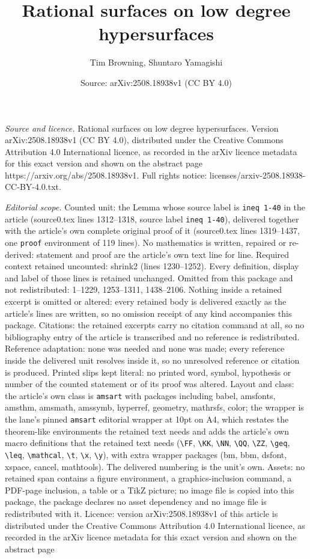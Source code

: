 \documentclass[10pt,a4paper]{amsart}
\title[Rational surfaces on low degree hypersurfaces]{Rational surfaces on low degree hypersurfaces}
\author{Tim Browning, Shuntaro Yamagishi}
\date{Source: arXiv:2508.18938v1 (CC BY 4.0)}
\numberwithin{equation}{section}
\begin{document}
\maketitle

\noindent\emph{Source and licence.} Rational surfaces on low degree hypersurfaces. Version arXiv:2508.18938v1 (CC BY 4.0), distributed under the Creative Commons Attribution 4.0 International licence, as recorded in the arXiv licence metadata for this exact version and shown on the abstract page https://arxiv.org/abs/2508.18938v1. Full rights notice: licenses/arxiv-2508.18938-CC-BY-4.0.txt.\par\smallskip

\noindent\textit{Editorial scope.} Counted unit: the Lemma whose source label is \texttt{ineq 1-40} in the article (source0.tex lines 1312--1318, source label \texttt{ineq 1-40}), delivered together with the article's own complete original proof of it (source0.tex lines 1319--1437, one \texttt{proof} environment of 119 lines). No mathematics is written, repaired or re-derived: statement and proof are the article's own text line for line. Required context retained uncounted: shrink2 (lines 1230--1252). Every definition, display and label of those lines is retained unchanged. Omitted from this package and not redistributed: 1--1229, 1253--1311, 1438--2106. Nothing inside a retained excerpt is omitted or altered: every retained body is delivered exactly as the article's lines are written, so no omission receipt of any kind accompanies this package. Citations: the retained excerpts carry no citation command at all, so no bibliography entry of the article is transcribed and no reference is redistributed. Reference adaptation: none was needed and none was made; every reference inside the delivered unit resolves inside it, so no unresolved reference or citation is produced. Printed slips kept literal: no printed word, symbol, hypothesis or number of the counted statement or of its proof was altered. Layout and class: the article's own class is \texttt{amsart} with packages including babel, amsfonts, amsthm, amsmath, amssymb, hyperref, geometry, mathrsfs, color; the wrapper is the lane's pinned \texttt{amsart} editorial wrapper at 10pt on A4, which restates the theorem-like environments the retained text needs and adds the article's own macro definitions that the retained text needs (\texttt{\textbackslash FF}, \texttt{\textbackslash KK}, \texttt{\textbackslash NN}, \texttt{\textbackslash QQ}, \texttt{\textbackslash ZZ}, \texttt{\textbackslash geq}, \texttt{\textbackslash leq}, \texttt{\textbackslash mathcal}, \texttt{\textbackslash t}, \texttt{\textbackslash x}, \texttt{\textbackslash y}), with extra wrapper packages (bm, bbm, dsfont, xspace, cancel, mathtools). The delivered numbering is the unit's own. Assets: no retained span contains a figure environment, a graphics-inclusion command, a PDF-page inclusion, a table or a TikZ picture; no image file is copied into this package, the package declares no asset dependency and no image file is redistributed with it. Licence: version arXiv:2508.18938v1 of this article is distributed under the Creative Commons Attribution 4.0 International licence, as recorded in the arXiv licence metadata for this exact version and shown on the abstract page 
\end{document}
